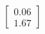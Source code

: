 \documentclass[preview]{standalone}
\begin{document}
\begin{align*}
\begin{bmatrix} 0.06 \\ 1.67 \end{bmatrix}
\end{align*}
\end{document}
